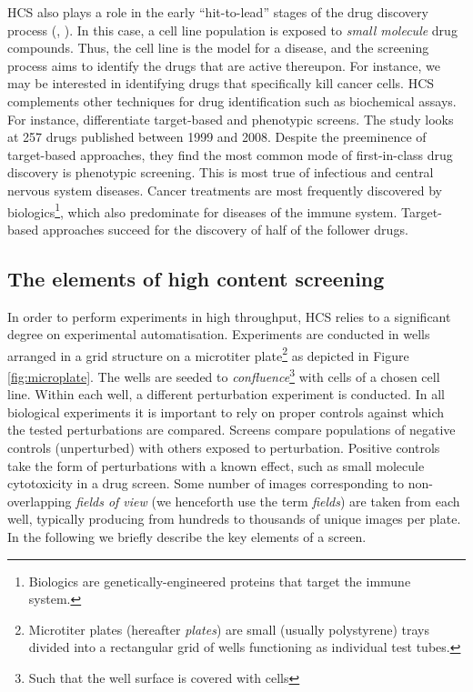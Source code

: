 HCS also plays a role in the early ``hit-to-lead'' stages of the drug discovery process (\cite{haney2006high}, \cite{pepperkok2006high}). In this case, a cell line population is exposed to \emph{small molecule} drug compounds. Thus, the cell line is the model for a disease, and the screening process aims to identify the drugs that are active thereupon. For instance, we may be interested in identifying drugs that specifically kill cancer cells. HCS complements other techniques for drug identification such as biochemical assays. For instance, \cite{swinney2011were} differentiate target-based and phenotypic screens. The study looks at 257 drugs published between 1999 and 2008. Despite the preeminence of target-based approaches, they find the most common mode of first-in-class drug discovery is phenotypic screening. This is most true of infectious and central nervous system diseases. Cancer treatments are most frequently discovered by biologics\footnote{Biologics are genetically-engineered proteins that target the immune system.}, which also predominate for diseases of the immune system. Target-based approaches succeed for the discovery of half of the follower drugs.

\subsection{The elements of high content screening}
\label{subsec:elements_hcs}

In order to perform experiments in high throughput, HCS relies to a significant degree on experimental automatisation. Experiments are conducted in wells arranged in a grid structure on a microtiter plate\footnote{Microtiter plates (hereafter \emph{plates}) are small (usually polystyrene) trays divided into a rectangular grid of wells functioning as individual test tubes.} as depicted in Figure \ref{fig:microplate}. The wells are seeded to \emph{confluence}\footnote{Such that the well surface is covered with cells} with cells of a chosen cell line. Within each well, a different perturbation experiment is conducted. In all biological experiments it is important to rely on proper controls against which the tested perturbations are compared. Screens compare populations of negative controls (unperturbed) with others exposed to perturbation. Positive controls take the form of perturbations with a known effect, such as small molecule cytotoxicity in a drug screen. Some number of images corresponding to non-overlapping \emph{fields of view} (we henceforth use the term \emph{fields}) are taken from each well, typically producing from hundreds to thousands of unique images per plate. In the following we briefly describe the key elements of a screen.

